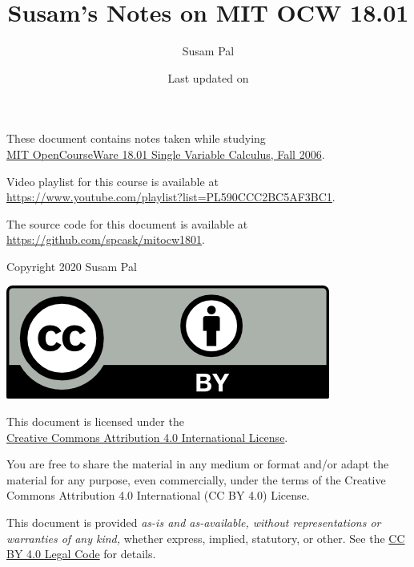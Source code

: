 \documentclass{article}
\author{Susam Pal}
\title{Susam's Notes on MIT OCW 18.01}
\date{
    \small Last updated on \updatedate
}
\theoremstyle{definition}
\begin{document}
\maketitle
\pagebreak

\newcommand{\texurl}{https://github.com/spcask/mitocw1801}
\newcommand{\ocwurl}{https://ocw.mit.edu/courses/mathematics/18-01-single-variable-calculus-fall-2006/}
\newcommand{\vidurl}{https://www.youtube.com/playlist?list=PL590CCC2BC5AF3BC1}
\newcommand{\ccbyurl}{http://creativecommons.org/licenses/by/4.0/}
\newcommand{\ccbylcurl}{https://creativecommons.org/licenses/by/4.0/legalcode}
\newcommand{\mitlurl}{https://opensource.org/licenses/MIT}
These document contains notes taken while studying \\
\href{\ocwurl}{MIT OpenCourseWare 18.01 Single Variable Calculus, Fall
2006}.

Video playlist for this course is available at \\
\url{\vidurl}.

The source code for this document is available at \\
\url{\texurl}.

\vspace{20mm}
Copyright \textcopyright{} 2020 Susam Pal

\href{\ccbyurl}{\includegraphics{ccby}}

This document is licensed under the\\
\href{\ccbyurl}{Creative Commons Attribution 4.0 International License}.

You are free to share the material in any medium or format and/or adapt
the material for any purpose, even commercially, under the terms of the
Creative Commons Attribution 4.0 International (CC BY 4.0) License.

This document is provided \emph{as-is and as-available, without
representations or warranties of any kind,} whether express, implied,
statutory, or other. See the
\href{\ccbylcurl}{CC BY 4.0 Legal Code} for details.
\pagebreak

\tableofcontents
\pagebreak

\pagebreak
\pagebreak
\end{document}
